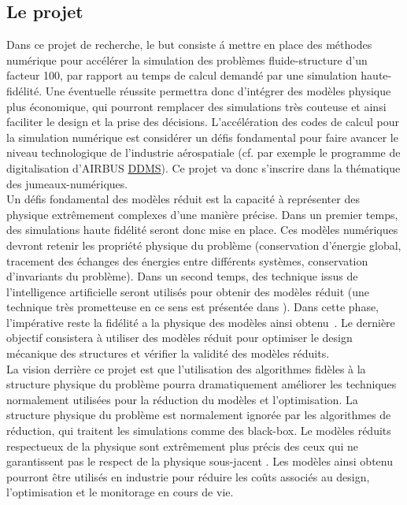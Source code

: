 \documentclass[french]{article}
\begin{document}
\subsection{Le projet}
Dans ce projet de recherche, le but consiste \'a mettre en place des méthodes numérique pour accélérer la simulation des problèmes fluide-structure d'un facteur 100, par rapport au temps de calcul demandé par une simulation haute-fidélité.  Une éventuelle réussite permettra donc d'intégrer des modèles physique plus économique, qui pourront remplacer des simulations très couteuse et ainsi faciliter le design et la prise des décisions. L'accélération des codes de calcul pour la simulation numérique est considérer un défis fondamental pour faire avancer le niveau technologique de l'industrie aérospatiale (cf. par exemple  le programme de digitalisation d'AIRBUS \href{https://www.airbus.com/innovation/industry-4-0/digital-design-and-manufacturing-ddms.html}{DDMS}). Ce projet va donc s'inscrire dans la thématique des jumeaux-numériques.  \\

Un défis fondamental des modèles réduit est la capacité \`a représenter des physique extrêmement complexes d'une manière précise. 
Dans un premier temps, des simulations haute fidélité seront donc mise en place. Ces modèles numériques devront retenir les propriété physique du problème (conservation d'énergie global, tracement des échanges des énergies entre différents systèmes, conservation d'invariants du problème). Dans un second temps, des technique issus de l'intelligence artificielle seront utilisés pour obtenir des modèles réduit (une technique très prometteuse en ce sens est présentée dans \cite{lee2020}). Dans cette phase, l'impérative reste la fidélité a la physique des modèles ainsi obtenu~\cite{willcox2021}. Le dernière objectif consistera \`a utiliser des modèles réduit pour optimiser le design mécanique des structures et vérifier la validité des modèles réduits.\\

La vision derrière ce projet est que l'utilisation des algorithmes fidèles \`a la structure physique du problème pourra dramatiquement améliorer les techniques normalement utilisées pour la réduction du modèles et l'optimisation. La structure physique du problème est normalement ignorée par les algorithmes de réduction, qui traitent les simulations comme des black-box. Le modèles réduits respectueux de la physique sont extrêmement plus précis des ceux qui ne garantissent pas le respect de la physique sous-jacent \cite{lee2020}. Les modèles ainsi obtenu pourront être utilisés en industrie pour réduire les  co\^{u}ts associés au design, l'optimisation et le monitorage en cours de vie.
\end{document}
